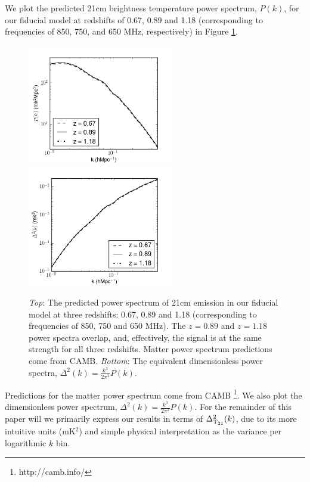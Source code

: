 \documentclass[10pt,iop]{emulateapj}
\begin{document}
We plot the predicted 21cm 
brightness temperature power spectrum, $P(k)$, for our fiducial model 
at redshifts of 0.67, 0.89 and 1.18 (corresponding to frequencies of 850,
750, and 650 MHz, respectively) in Figure \ref{fig:21cmps}.  
\begin{figure}\centering
\includegraphics[width=2.5in]{21cmps-2.png}
\includegraphics[width=2.5in]{21cmdelta-2.png}
\caption{
\emph{Top}: The predicted power spectrum of 21cm emission in our fiducial model at three redshifts:
0.67, 0.89 and 1.18 (corresponding to frequencies of 850, 750 and 650 MHz).  The $z = 0.89$ and $z = 1.18$ power spectra overlap, and, effectively, the signal is at the same strength for all three  
redshifts.  Matter power
spectrum predictions come from CAMB.  \emph{Bottom}: The equivalent dimensionless power spectra,
$\Delta^2(k) = \frac{k^3}{2\pi^2}P(k)$.
} \label{fig:21cmps}
\end{figure}
Predictions for the matter power spectrum
come from CAMB \citep{lewis_et_al_2000}\footnote{http://camb.info/}.  
We also plot the dimensionless power
spectrum, $\Delta^2(k) = \frac{k^3}{2\pi^2}P(k)$.  For the remainder of this paper
will we primarily express our results in terms of $\Delta_{\rm{T_{21}}}^2(k)$, due to its more
intuitive units (mK$^2$) and simple physical interpretation as the variance
per logarithmic $k$ bin.
\end{document}
